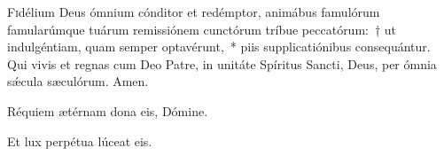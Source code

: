 \documentclass[vesperale_romanum]{subfiles}
\begin{document}
\lettrine{F}{i}délium Deus ómnium cónditor et redémptor, animábus famulórum famularúmque tuárum remissiónem cunctórum tríbue peccatórum:~† ut indulgéntiam, quam semper optavérunt,~* piis supplicatiónibus consequántur. Qui vivis et regnas cum Deo Patre, in unitáte Spíritus Sancti, Deus, per ómnia sǽcula sæculórum.
\rr Amen.

\label{vv_requiem_etc}

\vv Réquiem ætérnam dona eis, Dómine.

\rr Et lux perpétua lúceat eis.


\end{document}
